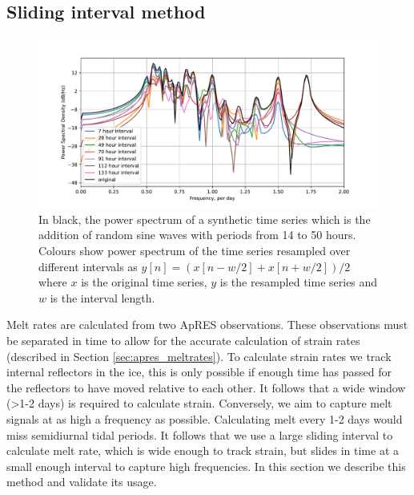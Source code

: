 \subsection{Sliding interval method}

\label{sec:synthetic}
\begin{figure}[!ht]
\centering
\includegraphics[width=1\textwidth]{chapters/3/synthetic.pdf}
\caption[Method analysis]{In black, the power spectrum of a synthetic time series which is the addition of random sine waves with periods from 14 to 50 hours. Colours show power spectrum of the time series resampled over different intervals as $y[n] = (x[n-w/2]+x[n+w/2])/2$ where $x$ is the original time series, $y$ is the resampled time series and $w$ is the interval length.}
\label{fig:synthetic}
\end{figure}

Melt rates are calculated from two ApRES observations. These observations must be separated in time to allow for the accurate calculation of strain rates  (described in Section \ref{sec:apres_meltrates}). To calculate strain rates we track internal reflectors in the ice, this is only possible if enough time has passed for the reflectors to have moved relative to each other. It follows that a wide window (>1-2 days) is required to calculate strain. Conversely, we aim to capture melt signals at as high a frequency as possible. Calculating melt every 1-2 days would miss semidiurnal tidal periods. It follows that we use a large sliding interval to calculate melt rate, which is wide enough to track strain, but slides in time at a small enough interval to capture high frequencies. In this section we describe this method and validate its usage.

